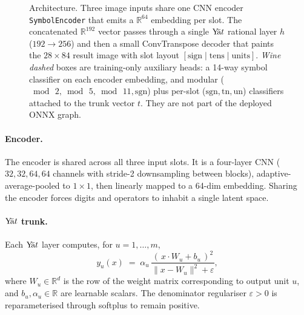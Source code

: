 \documentclass[11pt]{article}
\theoremstyle{papsty}
\newcommand{\yat}{$\textnormal{Y}\!\bar{\text{a}}t$}
\newcommand{\R}{\mathbb{R}}
\begin{document}
\begin{figure}[t]
{%
  }
  \caption{Architecture. Three image inputs share one CNN encoder
    \texttt{SymbolEncoder} that emits a $\R^{64}$ embedding per slot. The
    concatenated $\R^{192}$ vector passes through a single \yat{}
    rational layer $h$ ($192\!\to\!256$) and then a small ConvTranspose
    decoder that paints the $28{\times}84$ result image with slot layout
    $[\mathrm{sign}\!\mid\!\mathrm{tens}\!\mid\!\mathrm{units}]$.
    \emph{Wine dashed} boxes are training-only auxiliary heads: a 14-way
    symbol classifier on each encoder embedding, and modular
    ($\bmod\,2,\bmod\,5,\bmod\,11,\mathrm{sgn}$) plus per-slot
    ($\mathrm{sgn},\mathrm{tn},\mathrm{un}$) classifiers attached to the
    trunk vector $t$. They are not part of the deployed ONNX graph.}
  \label{fig:arch}
\end{figure}

\paragraph{Encoder.}
The encoder is shared across all three input slots. It is a four-layer
CNN ($32, 32, 64, 64$ channels with stride-2 downsampling between blocks),
adaptive-average-pooled to $1\!\times\!1$, then linearly mapped to a
64-dim embedding. Sharing the encoder forces digits and operators to
inhabit a single latent space.

\paragraph{\yat{} trunk.}
Each \yat{} layer computes, for $u = 1, \dots, m$,
\begin{equation}
y_u(x) \;=\; \alpha_u\,
  \frac{(\,x \cdot W_u + b_u\,)^{2}}{\lVert x - W_u \rVert^{2} + \varepsilon},
\label{eq:yat}
\end{equation}
where $W_u \in \R^{d}$ is the row of the weight matrix corresponding to
output unit $u$, and $b_u, \alpha_u \in \R$ are learnable scalars. The
denominator regulariser $\varepsilon > 0$ is reparameterised through
softplus to remain positive.
\end{document}
